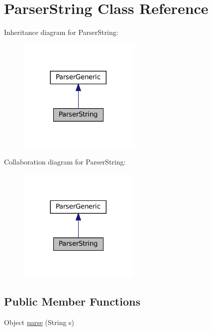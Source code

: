 \hypertarget{classParserString}{}\section{Parser\+String Class Reference}
\label{classParserString}


Inheritance diagram for Parser\+String\+:
\nopagebreak
\begin{figure}[H]
\begin{center}
\leavevmode
\includegraphics[width=164pt]{classParserString__inherit__graph}
\end{center}
\end{figure}


Collaboration diagram for Parser\+String\+:
\nopagebreak
\begin{figure}[H]
\begin{center}
\leavevmode
\includegraphics[width=164pt]{classParserString__coll__graph}
\end{center}
\end{figure}
\subsection*{Public Member Functions}
\begin{DoxyCompactItemize}
\item 
Object \hyperlink{classParserString_a7054c77bf5579a99a7abf166aad1c640}{parse} (String s)
\end{DoxyCompactItemize}


